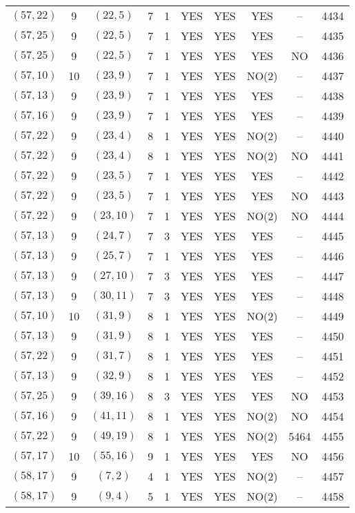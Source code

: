 \begin{longtable}{|c|c|c|c|c|c|c|c|c|c|}
$(57, 22)$ & 9 & $(22, 5)$ & 7 & 1 & YES & YES & YES & -- & 4434\\
$(57, 25)$ & 9 & $(22, 5)$ & 7 & 1 & YES & YES & YES & -- & 4435\\
$(57, 25)$ & 9 & $(22, 5)$ & 7 & 1 & YES & YES & YES & NO & 4436\\
$(57, 10)$ & 10 & $(23, 9)$ & 7 & 1 & YES & YES & NO(2) & -- & 4437\\
$(57, 13)$ & 9 & $(23, 9)$ & 7 & 1 & YES & YES & YES & -- & 4438\\
$(57, 16)$ & 9 & $(23, 9)$ & 7 & 1 & YES & YES & YES & -- & 4439\\
$(57, 22)$ & 9 & $(23, 4)$ & 8 & 1 & YES & YES & NO(2) & -- & 4440\\
$(57, 22)$ & 9 & $(23, 4)$ & 8 & 1 & YES & YES & NO(2) & NO & 4441\\
$(57, 22)$ & 9 & $(23, 5)$ & 7 & 1 & YES & YES & YES & -- & 4442\\
$(57, 22)$ & 9 & $(23, 5)$ & 7 & 1 & YES & YES & YES & NO & 4443\\
$(57, 22)$ & 9 & $(23, 10)$ & 7 & 1 & YES & YES & NO(2) & NO & 4444\\
$(57, 13)$ & 9 & $(24, 7)$ & 7 & 3 & YES & YES & YES & -- & 4445\\
$(57, 13)$ & 9 & $(25, 7)$ & 7 & 1 & YES & YES & YES & -- & 4446\\
$(57, 13)$ & 9 & $(27, 10)$ & 7 & 3 & YES & YES & YES & -- & 4447\\
$(57, 13)$ & 9 & $(30, 11)$ & 7 & 3 & YES & YES & YES & -- & 4448\\
$(57, 10)$ & 10 & $(31, 9)$ & 8 & 1 & YES & YES & NO(2) & -- & 4449\\
$(57, 13)$ & 9 & $(31, 9)$ & 8 & 1 & YES & YES & YES & -- & 4450\\
$(57, 22)$ & 9 & $(31, 7)$ & 8 & 1 & YES & YES & YES & -- & 4451\\
$(57, 13)$ & 9 & $(32, 9)$ & 8 & 1 & YES & YES & YES & -- & 4452\\
$(57, 25)$ & 9 & $(39, 16)$ & 8 & 3 & YES & YES & YES & NO & 4453\\
$(57, 16)$ & 9 & $(41, 11)$ & 8 & 1 & YES & YES & NO(2) & NO & 4454\\
$(57, 22)$ & 9 & $(49, 19)$ & 8 & 1 & YES & YES & NO(2) & 5464 & 4455\\
$(57, 17)$ & 10 & $(55, 16)$ & 9 & 1 & YES & YES & YES & NO & 4456\\
$(58, 17)$ & 9 & $(7, 2)$ & 4 & 1 & YES & YES & NO(2) & -- & 4457\\
$(58, 17)$ & 9 & $(9, 4)$ & 5 & 1 & YES & YES & NO(2) & -- & 4458\\

\end{longtable}
